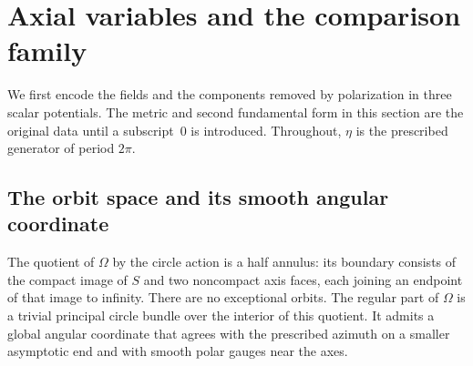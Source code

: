 \section{Axial variables and the comparison family}\label{a:section}

We first encode the fields and the components removed by polarization in
three scalar potentials.  The metric and second fundamental form in this
section are the original data until a subscript~$0$ is introduced.
Throughout, $\eta$ is the prescribed generator of period $2\pi$.

\subsection{The orbit space and its smooth angular coordinate}

\begin{lemma}\label{a:topology}
The quotient of $\Omega$ by the circle action is a half annulus: its
boundary consists of the compact image of $S$ and two noncompact axis
faces, each joining an endpoint of that image to infinity.  There are no
exceptional orbits.  The regular part of $\Omega$ is a trivial principal
circle bundle over the interior of this quotient.  It admits a global
angular coordinate that agrees with the prescribed azimuth on a smaller
asymptotic end and with smooth polar gauges near the axes.
\end{lemma}

